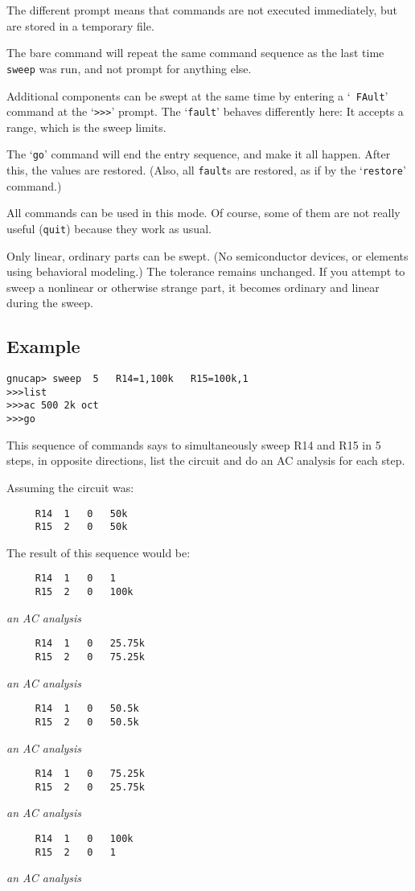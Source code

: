 The different prompt means that commands are not executed immediately, but
are stored in a temporary file.

The bare command will repeat the same command sequence as the last time {\tt
sweep} was run, and not prompt for anything else.

Additional components can be swept at the same time by entering a `{\tt
FAult}' command at the `{\tt >>>}' prompt.  The `{\tt fault}' behaves
differently here:  It accepts a range, which is the sweep limits.

The `{\tt go}' command will end the entry sequence, and make it all happen.
After this, the values are restored.  (Also, all {\tt fault}s are restored,
as if by the `{\tt restore}' command.)

All commands can be used in this mode.  Of course, some of them are not
really useful ({\tt quit}) because they work as usual.

Only linear, ordinary parts can be swept.  (No semiconductor devices, or
elements using behavioral modeling.)  The tolerance remains unchanged.  If
you attempt to sweep a nonlinear or otherwise strange part, it becomes
ordinary and linear during the sweep.
\subsection{Example}

\begin{verbatim}
gnucap> sweep  5   R14=1,100k   R15=100k,1
>>>list
>>>ac 500 2k oct
>>>go
\end{verbatim}

This sequence of commands says to simultaneously sweep R14 and R15 in 5 steps,
in opposite directions, list the circuit and do an AC analysis for each step.

Assuming the circuit was:
\begin{verbatim}
     R14  1   0   50k
     R15  2   0   50k
\end{verbatim}

The result of this sequence would be:
\begin{verbatim}
     R14  1   0   1
     R15  2   0   100k
\end{verbatim}
{\rm {\it an AC analysis}}
\begin{verbatim}
     R14  1   0   25.75k
     R15  2   0   75.25k
\end{verbatim}
{\rm {\it an AC analysis}}
\begin{verbatim}
     R14  1   0   50.5k
     R15  2   0   50.5k
\end{verbatim}
{\rm {\it an AC analysis}}
\begin{verbatim}
     R14  1   0   75.25k
     R15  2   0   25.75k
\end{verbatim}
{\rm {\it an AC analysis}}
\begin{verbatim}
     R14  1   0   100k
     R15  2   0   1
\end{verbatim}
{\rm {\it an AC analysis}}

